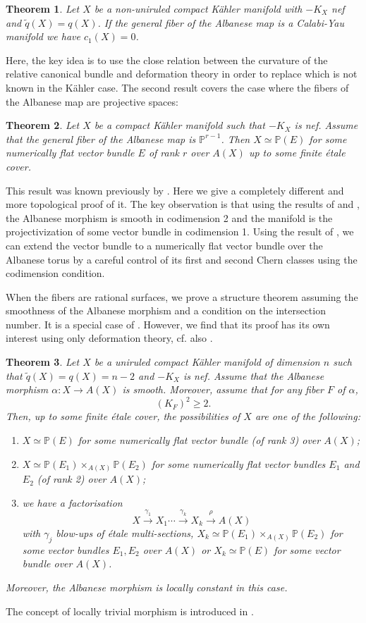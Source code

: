 \documentclass[a4, 12pt]{amsart}
\numberwithin{equation}{section}
\newtheorem{bigthm}{Theorem}
\theoremstyle{definition}
\def\P{\mathbb{P}}
\def\P{\mathbb{P}}
\begin{document}
\begin{bigthm}
Let $X$ be a non-uniruled compact K\"ahler manifold with $-K_X$ nef and $\tilde{q}(X)=q(X)$. If the general fiber of the Albanese map is a Calabi-Yau manifold we have $c_1(X)=0$.
\end{bigthm}
Here, the key idea is to use the close relation between the curvature of the relative canonical bundle and deformation theory in order to replace \cite{BDPP} which is not known in the K\"ahler case.
The second result covers the case where the fibers of the Albanese map are projective spaces:
\begin{bigthm}
Let $X$ be a compact K\"ahler manifold such that 
$-K_X$ is nef.
Assume that the general fiber of the Albanese map is $\P^{r-1}$.
Then $X \simeq \P(E)$ for some numerically flat vector bundle $E$ of rank $r$ over $A(X)$ up to some finite \'etale cover.
\end{bigthm}
This result was  known previously by \cite{CH17}. Here we give a completely different and more topological proof of it.
The key observation is that using the results of \cite{Cao13} and \cite{ARM14}, the Albanese morphism is smooth in codimension 2 and the manifold is the projectivization of some vector bundle in codimension 1.
Using the result of \cite{BS94}, we can extend the vector bundle to a numerically flat vector bundle over the Albanese torus by a careful control of its first and second Chern classes using the codimension condition.

When the fibers are rational surfaces, we prove a structure theorem assuming the smoothness of the Albanese morphism and a condition on the intersection number. It is a special case of \cite{CH17}.
However, we find that its proof has its own interest using only deformation theory, cf. also \cite[Corollary 3.4]{PS98}.
\begin{bigthm}
 Let $X$ be a uniruled compact K\"ahler manifold of dimension $n$ such that
$\tilde{q}(X)=q(X)=n-2$ and
$-K_X$ is nef.
Assume that the Albanese morphism $\alpha: X \to A(X)$ is smooth.
Moreover, assume that for any fiber $F$ of $\alpha$,
$$(K_F)^2 \geq 2.$$
Then, up to some finite \'etale cover, the possibilities of $X$ are one of the following:
\newpage
\begin{enumerate}
 \item $X \simeq \P(E)$ for some numerically flat vector bundle (of rank 3) over $A(X)$;
 \item $X \simeq \P(E_1) \times_{A(X)} \P(E_2)$ for some numerically flat vector bundles $E_1$ and $E_2$ (of rank 2) over $A(X)$;
 \item we have a factorisation
$$X \xrightarrow{\gamma_1} X_1 \cdots \xrightarrow{\gamma_k} X_k \xrightarrow{\rho}  A(X)$$
with $\gamma_j$ blow-ups of  \'etale multi-sections, $X_k \simeq \P(E_1) \times_{A(X)} \P(E_2)$ for some vector bundles $E_1,E_2$ over $A(X)$ or $X_k \simeq \P(E)$ for some vector bundle over $A(X)$.
\end{enumerate}
Moreover, the Albanese morphism is locally constant in this case.
\end{bigthm}
The concept of locally trivial morphism is introduced in \cite{MW}.
\end{document}
